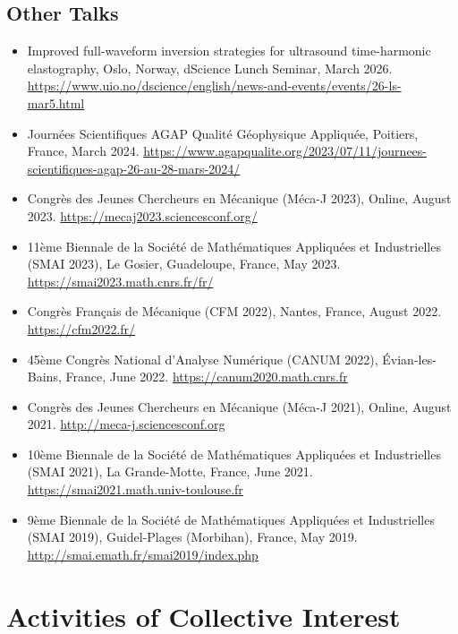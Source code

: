 \documentclass[10pt]{article} %
\begin{document}
\subsection{Other Talks}
\begin{itemize}
\item Improved full-waveform inversion strategies for ultrasound time-harmonic elastography, Oslo, Norway, dScience Lunch Seminar, March 2026. \url{https://www.uio.no/dscience/english/news-and-events/events/26-ls-mar5.html}
\item Journées Scientifiques AGAP Qualité Géophysique Appliquée, Poitiers, France, March 2024. \url{https://www.agapqualite.org/2023/07/11/journees-scientifiques-agap-26-au-28-mars-2024/}
\item Congrès des Jeunes Chercheurs en Mécanique (Méca-J 2023), Online, August 2023. \url{https://mecaj2023.sciencesconf.org/}
\item 11ème Biennale de la Société de Mathématiques Appliquées et Industrielles (SMAI 2023), Le Gosier, Guadeloupe, France, May 2023. \url{https://smai2023.math.cnrs.fr/fr/}
\item Congrès Français de Mécanique (CFM 2022), Nantes, France, August 2022. \url{https://cfm2022.fr/}
\item 45ème Congrès National d'Analyse Numérique (CANUM 2022), Évian-les-Bains, France, June 2022. \url{https://canum2020.math.cnrs.fr}
\item Congrès des Jeunes Chercheurs en Mécanique (Méca-J 2021), Online, August 2021. \url{http://meca-j.sciencesconf.org}
\item 10ème Biennale de la Société de Mathématiques Appliquées et Industrielles (SMAI 2021), La Grande-Motte, France, June 2021. \url{https://smai2021.math.univ-toulouse.fr}
\item 9ème Biennale de la Société de Mathématiques Appliquées et Industrielles (SMAI 2019), Guidel-Plages (Morbihan), France, May 2019. \url{http://smai.emath.fr/smai2019/index.php}
\end{itemize}

\section{Activities of Collective Interest}
\end{document}
